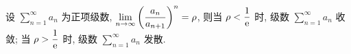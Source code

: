 \begin{theorem}
    设 $\displaystyle \sum_{n=1}^{\infty} a_n$ 为正项级数, $\displaystyle \lim_{n \to \infty}\qty(\dfrac{a_n}{a_{n+1}})^{n}=\rho$,
    则当 $\rho<\dfrac{1}{\mathrm{e}}$ 时, 级数 $\displaystyle \sum_{n=1}^{\infty} a_n$ 收敛; 当 $\rho>\dfrac{1}{\mathrm{e}}$ 时, 级数 $\displaystyle \sum_{n=1}^{\infty} a_n$ 发散.
\end{theorem}

% 
% 
% 
% 
% 
% 
% 
